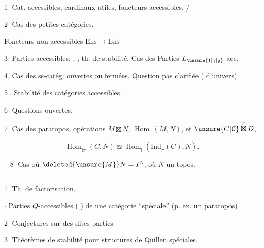 
\textcircled{1} Cat. accessibles, cardinaux utiles,  foncteurs accessibles. /

\textcircled{2} Cas des petites catégories.


Foncteurs non accessibles $\mathrm{Ens}\to\mathrm{Ens}$

\textcircled{3} Parties accessibles;  , , th. de stabilité.  Cas des Parties $L_{\unsure{1|\gamma|g}}$-acc. 

\textcircled{4}  Cas des ss-catég. ouvertes ou fermées. Question pas clarifiée ( d'univers)

\textcircled{5.} Stabilité des catégories accessibles.

\textcircled{6} Questions ouvertes.

\textcircled{7} Cas des paratopos, opérations $M\boxtimes N$, $\underline{\operatorname{Hom}}_!(M,N)$, et  $\unsure{C|\mathcal C}\mathbin{\overset{\pi}{\boxtimes}}D$,

\[\underline{\operatorname{Hom}}_{!\pi}(C,N)\approxeq\underline{\operatorname{Hom}}_!(\underline{\mathrm{Ind}}_\pi(C),N).\]

-- \textcircled{8}  Cas où $\deleted{\unsure{M}}N=I^\wedge$, où $N$ un topos.

\noindent\rule{.27\linewidth}{0.4pt}

\textcircled{1} \uline{Th. de factorisation}.

$\cdot$ Parties $Q$-accessibles ( ) de une  catégorie ``spéciale'' (p. ex. un paratopos)

\textcircled{2}  Conjectures sur  des dites parties --

\textcircled{3} Théorèmes de stabilité pour structures de Quillen spéciales.

